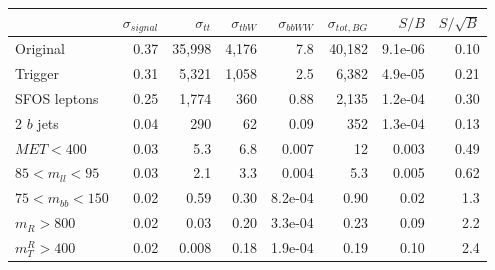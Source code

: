 \begin{tabular}{lrrrrrrr}
\toprule
{} &  $\sigma_{signal}$ &  $\sigma_{tt}$ &  $\sigma_{tbW}$ &  $\sigma_{bbWW}$ &  $\sigma_{tot, BG}$ &   $S/B$ &  $S/\sqrt{B}$ \\
\midrule
Original            &               0.37 &         35,998 &           4,176 &              7.8 &              40,182 & 9.1e-06 &          0.10 \\
Trigger             &               0.31 &          5,321 &           1,058 &              2.5 &               6,382 & 4.9e-05 &          0.21 \\
SFOS leptons        &               0.25 &          1,774 &             360 &             0.88 &               2,135 & 1.2e-04 &          0.30 \\
2 $b$ jets          &               0.04 &            290 &              62 &             0.09 &                 352 & 1.3e-04 &          0.13 \\
$MET < 400$         &               0.03 &            5.3 &             6.8 &            0.007 &                  12 &   0.003 &          0.49 \\
$85 < m_{ll} < 95$  &               0.03 &            2.1 &             3.3 &            0.004 &                 5.3 &   0.005 &          0.62 \\
$75 < m_{bb} < 150$ &               0.02 &           0.59 &            0.30 &          8.2e-04 &                0.90 &    0.02 &           1.3 \\
$m_{R} > 800$       &               0.02 &           0.03 &            0.20 &          3.3e-04 &                0.23 &    0.09 &           2.2 \\
$m_{T}^{R} > 400$   &               0.02 &          0.008 &            0.18 &          1.9e-04 &                0.19 &    0.10 &           2.4 \\
\bottomrule
\end{tabular}
